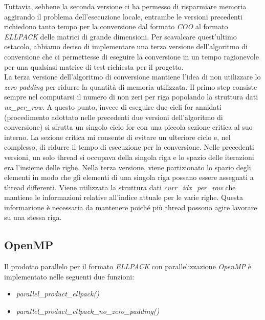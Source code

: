 \documentclass{article}
\begin{document}
Tuttavia, sebbene la seconda versione ci ha permesso di risparmiare memoria aggirando il problema dell'esecuzione locale, entrambe le versioni precedenti richiedono tanto tempo per la conversione dal formato \textit{COO} al formato \textit{ELLPACK} delle matrici di grande dimensioni. Per scavalcare quest'ultimo ostacolo, abbiamo deciso di implementare una terza versione dell'algoritmo di conversione che ci permettesse di eseguire la conversione in un tempo ragionevole per una qualsiasi matrice di test richiesta per il progetto.\\

La terza versione dell'algoritmo di conversione mantiene l'idea di non utilizzare lo \textit{zero padding} per ridurre la quantità di memoria utilizzata. Il primo step consiste sempre nel computarsi il numero di non zeri per riga popolando la struttura dati \textit{nz\_per\_row}. A questo punto, invece di eseguire due cicli for annidati (procedimento adottato nelle precedenti due versioni dell'algoritmo di conversione) si sfrutta un singolo ciclo for con una piccola sezione critica al suo interno. La sezione critica mi consente di evitare un ulteriore ciclo e, nel complesso, di ridurre il tempo di esecuzione per la conversione. Nelle precedenti versioni, un solo thread si occupava della singola riga e lo spazio delle iterazioni era l'insieme delle righe. Nella terza versione, viene partizionato lo spazio degli elementi in modo che gli elementi di una singola riga possano essere assegnati a thread differenti. Viene utilizzata la struttura dati \textit{curr\_idx\_per\_row} che mantiene le informazioni relative all'indice attuale per le varie righe. Questa informazione è necessaria da mantenere poiché più thread possono agire lavorare su una stessa riga.

\subsection{OpenMP}
Il prodotto parallelo per il formato \textit{ELLPACK} con parallelizzazione \textit{OpenMP} è implementato nelle seguenti due funzioni:

\begin{itemize}
\item \textit{parallel\_product\_ellpack()}
\item \textit{parallel\_product\_ellpack\_no\_zero\_padding()}
\end{itemize}
\end{document}
